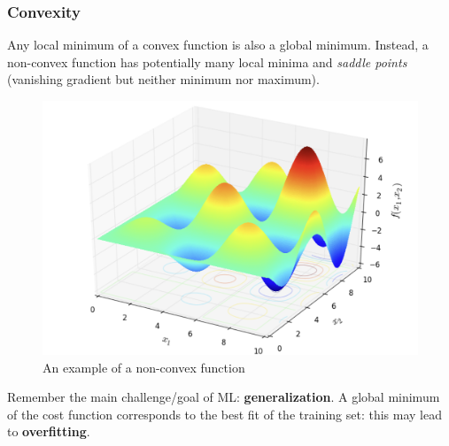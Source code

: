 \documentclass{beamer}
\begin{document}
%		
%		

	\begin{frame}
		\frametitle{Convexity}
		Any local minimum of a convex function is also a global minimum. 
		Instead, a non-convex function has potentially many local minima and \textit{saddle points} (vanishing gradient but neither minimum nor maximum).
		
		\begin{figure}
			\centering
			\includegraphics[scale=0.25]{images/non_convex}
			\caption{An example of a non-convex function}
		\end{figure}
		
		Remember the main challenge/goal of ML: \textbf{generalization}.  A global minimum of the cost function corresponds to the best fit of the training set: this may lead to \textbf{overfitting}.
	\end{frame}

%		
%		
%		
\end{document}
